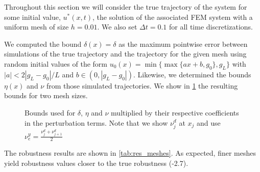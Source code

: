 \documentclass[letterpaper, 10 pt, conference]{ieeeconf/ieeeconf}
\begin{document}
Throughout this
section we will consider the true trajectory of the system for some initial
value, $u^*(x, t)$, the solution of the associated FEM system with a uniform mesh of
size $h = 0.01$. We also set $\Delta t = 0.1$ for all time discretizations.

We computed the bound $\delta(x) = \delta$ as the maximum pointwise
error between simulations of the true trajectory and the trajectory for the
given mesh using random initial values of the form $u_0(x) = \min\{\max\{a x +
b, g_0\}, g_L\}$ with $|a| < 2 |g_L - g_0| / L$ and $b \in (0, |g_L - g_0|)$.
Likewise, we determined the bounds $\eta(x)$ and $\nu$ from those simulated
trajectories. We show in \cref{fig:bounds} the resulting bounds for two mesh
sizes.

\begin{figure}[!t]
    \centering 
        \hfill
        \hfill
    \caption{Bounds used for $\delta$, $\eta$ and $\nu$ multiplied by their
    respective coefficients in the perturbation terms. Note that we show $\nu^d_j$ at
    $x_j$ and use $\nu_e^y = \frac{\nu^d_j + \nu^d_{j+1}}{2}$}
    \label{fig:bounds}
\end{figure}

The robustness results are shown in \cref{tab:res_meshes}. As expected, finer meshes
yield robustness values closer to the true robustness (-2.7).
\end{document}
